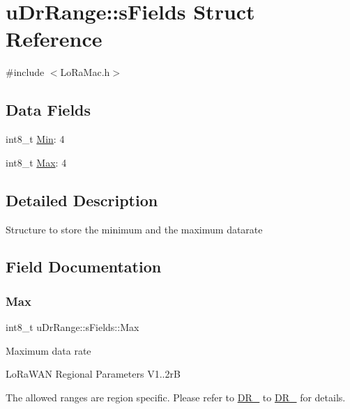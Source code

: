 \hypertarget{structuDrRange_1_1sFields}{}\section{u\+Dr\+Range\+:\+:s\+Fields Struct Reference}
\label{structuDrRange_1_1sFields}


{\ttfamily \#include $<$Lo\+Ra\+Mac.\+h$>$}

\subsection*{Data Fields}
\begin{DoxyCompactItemize}
\item 
int8\+\_\+t \hyperlink{structuDrRange_1_1sFields_aa441513e365122d82f18aec9e7257a35}{Min}\+: 4
\item 
int8\+\_\+t \hyperlink{structuDrRange_1_1sFields_a4fbbc67fabfd2bf96616b34d03786fc8}{Max}\+: 4
\end{DoxyCompactItemize}


\subsection{Detailed Description}
Structure to store the minimum and the maximum datarate 

\subsection{Field Documentation}
\mbox{\label{structuDrRange_1_1sFields_a4fbbc67fabfd2bf96616b34d03786fc8}} 
\subsubsection{\texorpdfstring{Max}{Max}}
{\footnotesize\ttfamily int8\+\_\+t u\+Dr\+Range\+::s\+Fields\+::\+Max}

Maximum data rate

Lo\+Ra\+W\+AN Regional Parameters V1..\+2rB

The allowed ranges are region specific. Please refer to \hyperlink{group__REGION_ga6c4ef966b4f3d5eb7597b087f2b97095}{D\+R\+\_} to \hyperlink{group__REGION_gac6e078f51b71f05093daf27834997396}{D\+R\+\_} for details. \mbox{\label{structuDrRange_1_1sFields_aa441513e365122d82f18aec9e7257a35}} 
